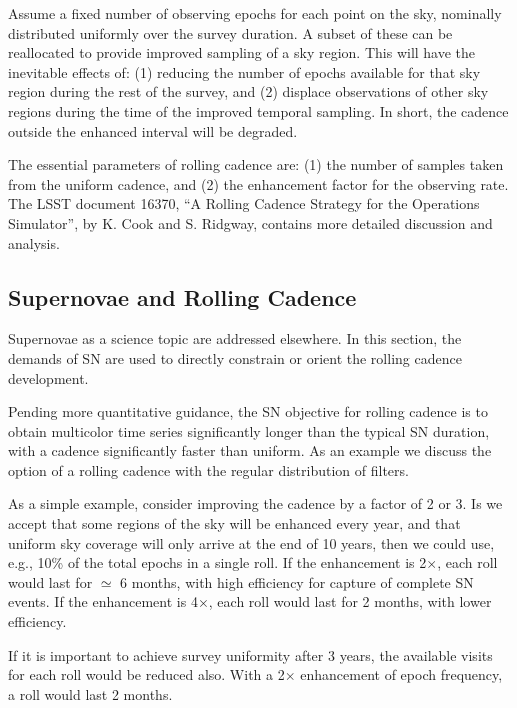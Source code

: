 Assume a fixed number of observing epochs for each point on the sky, nominally distributed uniformly over the survey duration.  A subset of these can be reallocated to provide improved sampling of a sky region.  This will have the inevitable effects of: (1) reducing the number of epochs available for that sky region during the rest of the survey, and (2) displace observations of other sky regions during the time of the improved temporal sampling.  In short, the cadence outside the enhanced interval will be degraded.  

The essential parameters of rolling cadence are: (1) the number of samples taken from the uniform cadence, and (2) the enhancement factor for the observing rate.  The LSST document 16370, ``A Rolling Cadence Strategy for the Operations Simulator'', by K. Cook and S. Ridgway,  contains more detailed discussion and analysis.

\subsection{ Supernovae and Rolling Cadence}
\label{sec:rolling:supernovae}


Supernovae as a science topic are addressed elsewhere.
In this section, the demands of SN are used to directly constrain or
orient the rolling cadence development.

Pending more quantitative guidance, the SN objective for rolling cadence is to obtain multicolor time series significantly longer than the typical SN duration, with a cadence significantly faster than uniform.  As an example we discuss the option of a rolling cadence with the regular distribution of filters.

As a simple example, consider improving the cadence by a factor of 2 or 3.  Is we accept that some regions of the sky will be enhanced every year, and that uniform sky coverage will only arrive at the end of 10 years, then we could use, e.g., 10\% of the total epochs in a single roll.  If the enhancement is 2$\times$, each roll would last for $\simeq$ 6 months, with high efficiency for capture of complete SN events.  If the enhancement is 4$\times$, each roll would last for 2 months, with lower efficiency.

If it is important to achieve survey uniformity after 3 years, the available visits for each roll would be reduced also.  With a 2$\times$ enhancement of epoch frequency, a roll would last 2 months.

